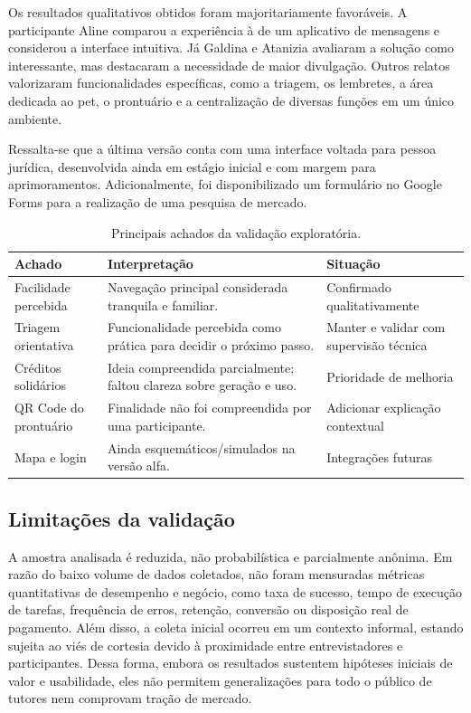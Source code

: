 \documentclass[12pt,a4paper]{article}
\begin{document}
Os resultados qualitativos obtidos foram majoritariamente favoráveis. A participante Aline comparou a experiência à de um aplicativo de mensagens e considerou a interface intuitiva. Já Galdina e Atanizia avaliaram a solução como interessante, mas destacaram a necessidade de maior divulgação. Outros relatos valorizaram funcionalidades específicas, como a triagem, os lembretes, a área dedicada ao pet, o prontuário e a centralização de diversas funções em um único ambiente.

Ressalta-se que a última versão conta com uma interface voltada para pessoa jurídica, desenvolvida ainda em estágio inicial e com margem para aprimoramentos. Adicionalmente, foi disponibilizado um formulário no Google Forms para a realização de uma pesquisa de mercado.


\begin{table}[H]
\centering
\caption{Principais achados da validação exploratória.}
\begin{tabularx}{\textwidth}{p{3.7cm}Y p{3.2cm}}
\toprule
\textbf{Achado} & \textbf{Interpretação} & \textbf{Situação}\\
\midrule
Facilidade percebida & Navegação principal considerada tranquila e familiar. & Confirmado qualitativamente\\
Triagem orientativa & Funcionalidade percebida como prática para decidir o próximo passo. & Manter e validar com supervisão técnica\\
Créditos solidários & Ideia compreendida parcialmente; faltou clareza sobre geração e uso. & Prioridade de melhoria\\
QR Code do prontuário & Finalidade não foi compreendida por uma participante. & Adicionar explicação contextual\\
Mapa e login & Ainda esquemáticos/simulados na versão alfa. & Integrações futuras\\
\bottomrule
\end{tabularx}
\end{table}

\subsection{Limitações da validação}
A amostra analisada é reduzida, não probabilística e parcialmente anônima. Em razão do baixo volume de dados coletados, não foram mensuradas métricas quantitativas de desempenho e negócio, como taxa de sucesso, tempo de execução de tarefas, frequência de erros, retenção, conversão ou disposição real de pagamento. Além disso, a coleta inicial ocorreu em um contexto informal, estando sujeita ao viés de cortesia devido à proximidade entre entrevistadores e participantes. Dessa forma, embora os resultados sustentem hipóteses iniciais de valor e usabilidade, eles não permitem generalizações para todo o público de tutores nem comprovam tração de mercado.
\end{document}
